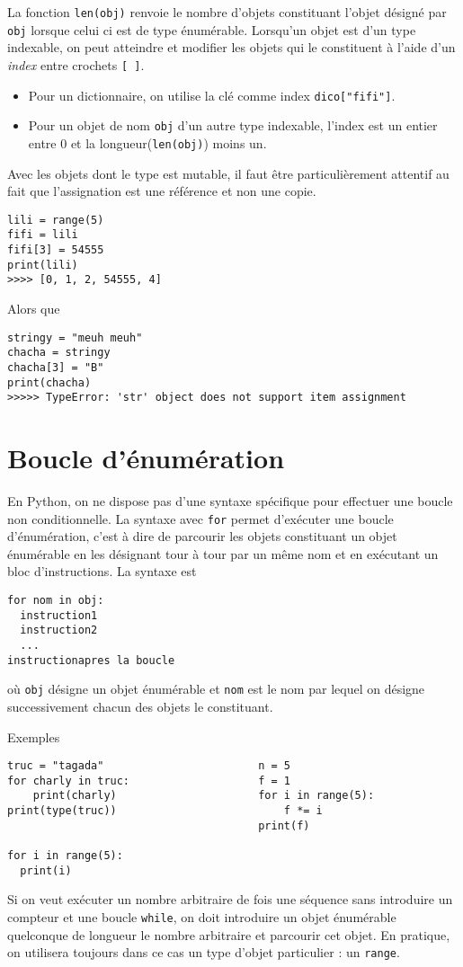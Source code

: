 La fonction \verb|len(obj)| renvoie le nombre d'objets constituant l'objet désigné par \verb|obj| lorsque celui ci est de type énumérable.\newline
Lorsqu'un objet est d'un type indexable, on peut atteindre et modifier les objets qui le constituent à l'aide d'un \emph{index} entre crochets \verb|[ ]|.
\begin{itemize}
 \item Pour un dictionnaire, on utilise la clé comme index \verb|dico["fifi"]|.
 \item Pour un objet de nom \verb|obj| d'un autre type indexable, l'index est un entier entre 0 et la longueur(\verb|len(obj)|) moins un. 
\end{itemize}
Avec les objets dont le type est mutable, il faut être particulièrement attentif au fait que l'assignation est une référence et non une copie.
\begin{verbatim}
lili = range(5)
fifi = lili
fifi[3] = 54555
print(lili)
>>>> [0, 1, 2, 54555, 4]\end{verbatim}
Alors que 
\begin{verbatim}
stringy = "meuh meuh"
chacha = stringy
chacha[3] = "B"
print(chacha)
>>>>> TypeError: 'str' object does not support item assignment\end{verbatim}

\section{Boucle d'énumération}
En Python, on ne dispose pas d'une syntaxe spécifique pour effectuer une boucle non conditionnelle. La syntaxe avec \texttt{for} permet d'exécuter une boucle d'énumération, c'est à dire de parcourir les objets constituant un objet énumérable en les désignant tour à tour par un même nom et en exécutant un bloc d'instructions. 
La syntaxe est
\begin{verbatim}
for nom in obj:
  instruction1
  instruction2
  ...
instructionapres la boucle\end{verbatim}
où \texttt{obj} désigne un objet énumérable et \texttt{nom} est le nom par lequel on désigne successivement chacun des objets le constituant. 

Exemples
\begin{verbatim}
truc = "tagada"                        n = 5                     
for charly in truc:                    f = 1
    print(charly)                      for i in range(5):
print(type(truc))                          f *= i
                                       print(f)
                                       
for i in range(5):
  print(i)
\end{verbatim}
Si on veut exécuter un nombre arbitraire de fois une séquence sans introduire un compteur et une boucle \texttt{while}, on doit introduire un objet énumérable quelconque de longueur le nombre arbitraire et parcourir cet objet. En pratique, on utilisera toujours dans ce cas un type d'objet particulier : un \texttt{range}.

